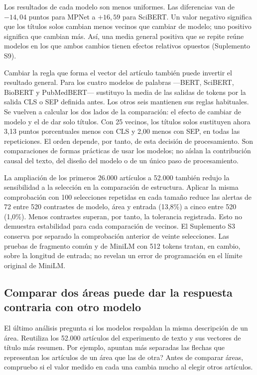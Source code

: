 \documentclass[12pt]{article}
\begin{document}
Los resultados de cada modelo son menos uniformes. Las diferencias van de $-14,04$ puntos para MPNet a $+16,59$ para SciBERT. Un valor negativo significa que los títulos solos cambian menos vecinos que cambiar de modelo; uno positivo significa que cambian más. Así, una media general positiva que se repite reúne modelos en los que ambos cambios tienen efectos relativos opuestos (Suplemento S9).

Cambiar la regla que forma el vector del artículo también puede invertir el resultado general. Para los cuatro modelos de palabras ---BERT, SciBERT, BioBERT y PubMedBERT--- sustituyo la media de las salidas de tokens por la salida CLS o SEP definida antes. Los otros seis mantienen sus reglas habituales. Se vuelven a calcular los dos lados de la comparación: el efecto de cambiar de modelo y el de dar solo títulos. Con 25 vecinos, los títulos solos sustituyen ahora 3,13 puntos porcentuales menos con CLS y 2,00 menos con SEP, en todas las repeticiones. El orden depende, por tanto, de esta decisión de procesamiento. Son comparaciones de formas prácticas de usar los modelos; no aíslan la contribución causal del texto, del diseño del modelo o de un único paso de procesamiento.

La ampliación de los primeros 26.000 artículos a 52.000 también redujo la sensibilidad a la selección en la comparación de estructura. Aplicar la misma comprobación con 100 selecciones repetidas en cada tamaño reduce las alertas de 72 entre 520 contrastes de modelo, área y entrada (13,8\%) a cinco entre 520 (1,0\%). Menos contrastes superan, por tanto, la tolerancia registrada. Esto no demuestra estabilidad para cada comparación de vecinos. El Suplemento S3 conserva por separado la comprobación anterior de veinte selecciones. Las pruebas de fragmento común y de MiniLM con 512 tokens tratan, en cambio, sobre la longitud de entrada; no revelan un error de programación en el límite original de MiniLM.

\FloatBarrier
\subsection{Comparar dos áreas puede dar la respuesta contraria con otro modelo}
El último análisis pregunta si los modelos respaldan la misma descripción de un área. Reutiliza los 52.000 artículos del experimento de texto y sus vectores de título más resumen. Por ejemplo, \textquestiondown{}apuntan más separadas las flechas que representan los artículos de un área que las de otra? Antes de comparar áreas, compruebo si el valor medido en cada una cambia mucho al elegir otros artículos.
\end{document}
